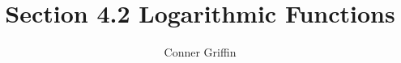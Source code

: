 \documentclass{ximera}
\title{Section 4.2 Logarithmic Functions}
\author{Conner Griffin}
\begin{document}
\begin{abstract}
    
\end{abstract}
\maketitle





\end{document}
